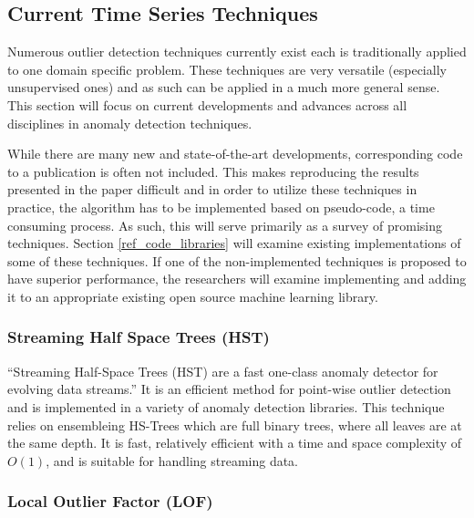 \subsection{Current Time Series Techniques}
Numerous outlier detection techniques currently exist each is traditionally applied to one domain specific problem. These techniques are very versatile (especially unsupervised ones) and as such can be applied in a much more general sense. This section will focus on current developments and advances across all disciplines in anomaly detection techniques.

While there are many new and state-of-the-art developments, corresponding code to a publication is often not included. This makes reproducing the results presented in the paper difficult and in order to utilize these techniques in practice, the algorithm has to be implemented based on pseudo-code, a time consuming process. As such, this will serve primarily as a survey of promising techniques. Section \ref{ref_code_libraries} will examine existing implementations of some of these techniques. If one of the non-implemented techniques is proposed to have superior performance, the researchers will examine implementing and adding it to an appropriate existing open source machine learning library.

\subsubsection{Streaming Half Space Trees (HST)}
\enquote{Streaming Half-Space Trees (HST) are a fast one-class anomaly detector for evolving data streams.}\parencite{fast-anomaly-detection-streaming} It is an efficient method for point-wise outlier detection and is implemented in a variety of anomaly detection libraries. This technique relies on ensembleing HS-Trees which are full binary trees, where all leaves are at the same depth. It is fast, relatively efficient with a time and space complexity of $O(1)$, and is suitable for handling streaming data.



\subsubsection{Local Outlier Factor (LOF)}

